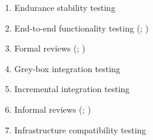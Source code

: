 \begin{enumerate}
    \item Endurance stability testing \citep[p.~55]{Firesmith2015}
    \item End-to-end functionality testing (\citealp[p.~20]{IEEE2021c}; \citealp[Tab.~2]{Gerrard2000a})
    \item Formal reviews (\citealpISTQB{}; \citealp[p.~12\=/14]{SWEBOK2024})
    \item Grey-box integration testing \citep[p.~344]{SakamotoEtAl2013}
    \item Incremental integration testing \citep[pp.~601, 603, 605\==606]{SharmaEtAl2021}
    \item Informal reviews (\citealpISTQB{}; \citealp[p.~12\=/14]{SWEBOK2024})
    \item Infrastructure compatibility testing \citep[p.~53]{Firesmith2015}

\end{enumerate}
